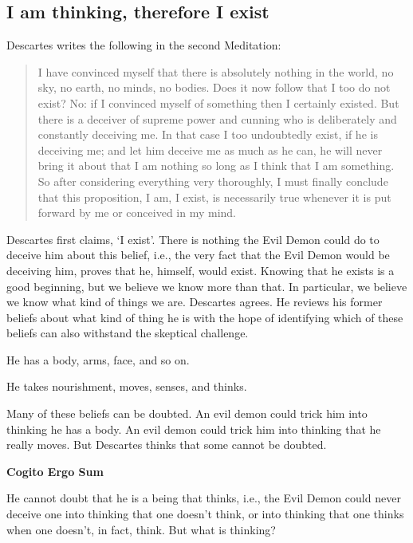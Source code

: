 \documentclass[]{article}
\begin{document}
\subsection{I am thinking, therefore I
exist}\label{i-am-thinking-therefore-i-exist}

Descartes writes the following in the second Meditation:

\begin{quote}
I have convinced myself that there is absolutely nothing in the world,
no sky, no earth, no minds, no bodies. Does it now follow that I too do
not exist? No: if I convinced myself of something then I certainly
existed. But there is a deceiver of supreme power and cunning who is
deliberately and constantly deceiving me. In that case I too undoubtedly
exist, if he is deceiving me; and let him deceive me as much as he can,
he will never bring it about that I am nothing so long as I think that I
am something. So after considering everything very thoroughly, I must
finally conclude that this proposition, I am, I exist, is necessarily
true whenever it is put forward by me or conceived in my mind.
\end{quote}

Descartes first claims, `I exist'. There is nothing the Evil Demon could
do to deceive him about this belief, i.e., the very fact that the Evil
Demon would be deceiving him, proves that he, himself, would exist.
Knowing that he exists is a good beginning, but we believe we know more
than that. In particular, we believe we know what kind of things we are.
Descartes agrees. He reviews his former beliefs about what kind of thing
he is with the hope of identifying which of these beliefs can also
withstand the skeptical challenge.

\begin{description}
\itemsep1pt\parskip0pt
\item[Beliefs about his body]
He has a body, arms, face, and so on.
\item[Beliefs about his functions:]
He takes nourishment, moves, senses, and thinks.
\end{description}

Many of these beliefs can be doubted. An evil demon could trick him into
thinking he has a body. An evil demon could trick him into thinking that
he really moves. But Descartes thinks that some cannot be doubted.

\textbf{Cogito Ergo Sum}

He cannot doubt that he is a being that thinks, i.e., the Evil Demon
could never deceive one into thinking that one doesn't think, or into
thinking that one thinks when one doesn't, in fact, think. But what is
thinking?
\end{document}
